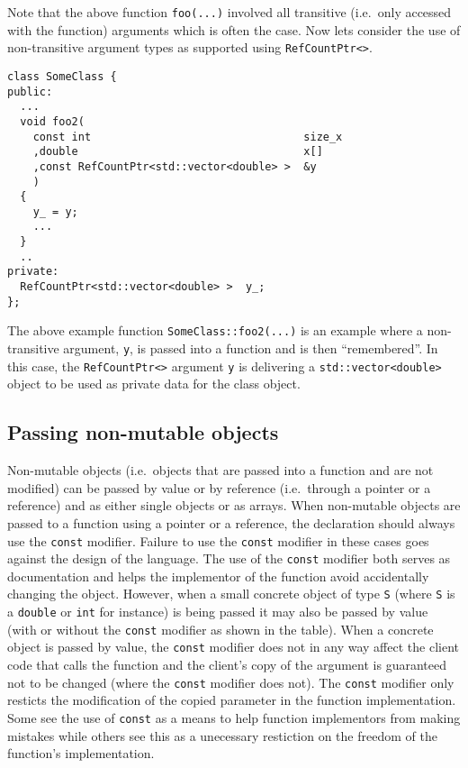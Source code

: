 Note that the above function {}\texttt{foo(...)} involved all
transitive (i.e.~only accessed with the function) arguments which is
often the case.  Now lets consider the use of non-transitive argument
types as supported using {}\texttt{Ref\-Count\-Ptr<>}.

{\scriptsize\begin{verbatim}
class SomeClass {
public:
  ...
  void foo2(
    const int                                 size_x
    ,double                                   x[]
    ,const RefCountPtr<std::vector<double> >  &y
    )
  {
    y_ = y;
    ...
  }
  ..
private:
  RefCountPtr<std::vector<double> >  y_;
};
\end{verbatim}}

{}\noindent{}The above example function
{}\texttt{SomeClass\-::foo2(...)} is an example where a non-transitive
argument, {}\texttt{y}, is passed into a function and is then
``remembered''.  In this case, the {}\texttt{Ref\-Count\-Ptr<>}
argument {}\texttt{y} is delivering a
{}\texttt{std\-::vector<\-double>} object to be used as private data
for the class object.

%
\subsection{Passing non-mutable objects}
%

Non-mutable objects (i.e.~objects that are passed into a function and
are not modified) can be passed by value or by reference (i.e.~through
a pointer or a reference) and as either single objects or as arrays.
When non-mutable objects are passed to a function using a pointer or a
reference, the declaration should always use the {}\texttt{const}
modifier.  Failure to use the {}\texttt{const} modifier in these cases
goes against the design of the language.  The use of the
{}\texttt{const} modifier both serves as documentation and helps the
implementor of the function avoid accidentally changing the object.
However, when a small concrete object of type {}\texttt{S} (where
{}\texttt{S} is a {}\texttt{double} or {}\texttt{int} for instance) is
being passed it may also be passed by value (with or without the
{}\texttt{const} modifier as shown in the table).  When a concrete
object is passed by value, the {}\texttt{const} modifier does not in
any way affect the client code that calls the function and the
client's copy of the argument is guaranteed not to be changed (where
the {}\texttt{const} modifier does not).  The {}\texttt{const}
modifier only resticts the modification of the copied parameter in the
function implementation.  Some see the use of {}\texttt{const} as a
means to help function implementors from making mistakes while others
see this as a unecessary restiction on the freedom of the function's
implementation.

